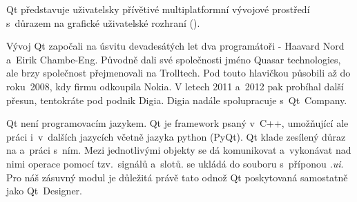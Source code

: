 Qt představuje uživatelsky přívětivé multiplatformní vývojové prostředí s~důrazem na grafické
uživatelské rozhraní (). 

Vývoj Qt započali na úsvitu devadesátých let dva programátoři - Haavard Nord a~Eirik
Chambe-Eng. Původně dali své společnosti jméno Quasar technologies, ale brzy společnost
přejmenovali na Trolltech. Pod touto hlavičkou působili až do roku~2008, kdy firmu odkoupila
Nokia. V letech 2011 a~2012 pak probíhal další přesun, tentokráte pod podnik Digia. Digia
nadále spolupracuje s~Qt~Company. 

Qt není programovacím jazykem. Qt je framework psaný v~C++, umožňující ale práci i~v~dalších jazycích
včetně jazyka python (PyQt). Qt klade zesílený důraz na  a~práci s~ním. Mezi jednotlivými
objekty se dá komunikovat a~vykonávat nad nimi operace pomocí tzv.~signálů a~slotů.  se ukládá
do souboru s~příponou \textit{.ui}. Pro náš zásuvný modul je důležitá právě tato odnož Qt poskytovaná
samostatně jako Qt~Designer. 




